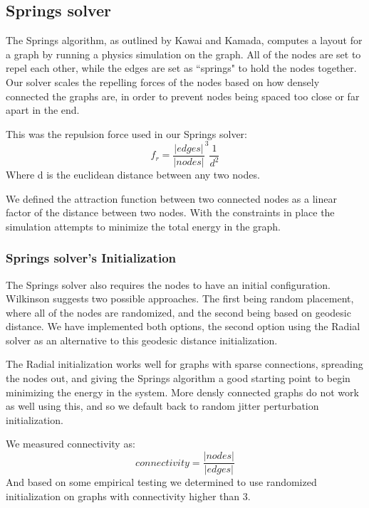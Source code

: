 \documentclass{article}
\begin{document}
\subsection{Springs solver}

The Springs algorithm, as outlined by Kawai and Kamada\cite{springs}, computes a layout for a graph by running a physics simulation on the graph. All of the nodes are set to repel each other, while the edges are set as ``springs" to hold the nodes together. Our solver scales the repelling forces of the nodes based on how densely connected the graphs are, in order to prevent nodes being spaced too close or far apart in the end.

This was the repulsion force used in our Springs solver:
$$ f_r = \frac{|edges|}{|nodes|}^3 \frac{1}{d^2} $$
Where d is the euclidean distance between any two nodes. 

We defined the attraction function between two connected nodes as a linear factor of the distance between two nodes. With the constraints in place the simulation attempts to minimize the total energy in the graph.

\subsubsection{Springs solver's Initialization}
The Springs solver also requires the nodes to have an initial configuration. Wilkinson \cite{grammarGraphics}
suggests two possible approaches. The first being random placement, where all of the nodes are randomized, and the second being based on geodesic distance. We have implemented both options, the second option using the Radial solver as an alternative to this geodesic distance initialization. 

The Radial initialization works well for graphs with sparse connections, spreading the nodes out, and giving the Springs algorithm a good starting point to begin minimizing the energy in the system. More densly connected graphs do not work as well using this, and so we default back to random jitter perturbation initialization.

We measured connectivity as:
$$connectivity = \frac{|nodes|}{|edges|}$$
And based on some empirical testing we determined to use randomized initialization on graphs with connectivity higher than 3.
\end{document}
